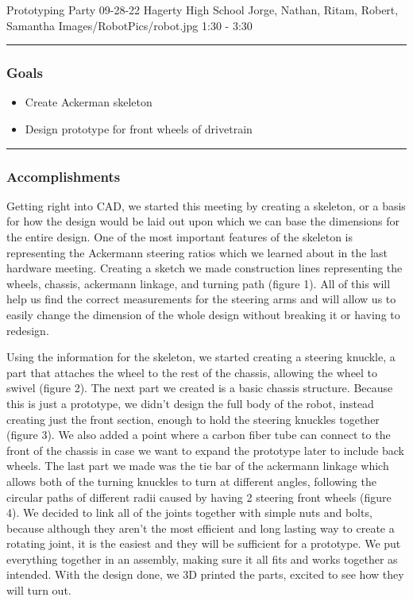 \insertmeeting 
	{Prototyping Party} 
	{09-28-22} 
	{Hagerty High School}
	{Jorge, Nathan, Ritam, Robert, Samantha}
	{Images/RobotPics/robot.jpg}
	{1:30 - 3:30}
	
\noindent\hfil\rule{\textwidth}{.4pt}\hfil
\subsubsection*{Goals}
\begin{itemize}
    \item Create Ackerman skeleton
    \item Design prototype for front wheels of drivetrain


\end{itemize} 

\noindent\hfil\rule{\textwidth}{.4pt}\hfil

\subsubsection*{Accomplishments}
Getting right into CAD, we started this meeting by creating a skeleton, or a basis for how the design would be laid out upon which we can base the dimensions for the entire design. One of the most important features of the skeleton is representing the Ackermann steering ratios which we learned about in the last hardware meeting. Creating a sketch we made construction lines representing the wheels, chassis, ackermann linkage, and turning path (figure 1). All of this will help us find the correct measurements for the steering arms and will allow us to easily change the dimension of the whole design without breaking it or having to redesign.

Using the information for the skeleton, we started creating a steering knuckle, a part that attaches the wheel to the rest of the chassis, allowing the wheel to swivel (figure 2). The next part we created is a basic chassis structure. Because this is just a prototype, we didn’t design the full body of the robot, instead creating just the front section, enough to hold the steering knuckles together (figure 3). We also added a point where a carbon fiber tube can connect to the front of the chassis in case we want to expand the prototype later to include back wheels. The last part we made was the tie bar of the ackermann linkage which allows both of the turning knuckles to turn at different angles, following the circular paths of different radii caused by having 2 steering front wheels (figure 4). We decided to link all of the joints together with simple nuts and bolts, because although they aren't the most efficient and long lasting way to create a rotating joint, it is the easiest and they will be sufficient for a prototype. We put everything together in an assembly, making sure it all fits and works together as intended. With the design done, we 3D printed the parts, excited to see how they will turn out.

